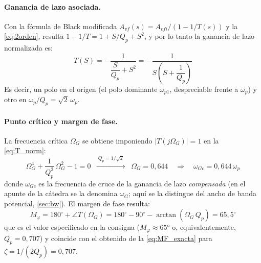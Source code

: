 \paragraph{Ganancia de lazo asociada.} Con la fórmula de Black modificada $A_{vf}(s) = A_{vfi}/(1 - 1/T(s))$ y la \autoref{eq:2orden}, resulta $1 - 1/T = 1 + S/Q_p + S^2$, y por lo tanto la ganancia de lazo normalizada es:
\begin{equation}
    T(S) = -\frac{1}{\dfrac{S}{Q_p} + S^2} = -\frac{1}{S\left(S + \dfrac{1}{Q_p}\right)}
    \label{eq:T_norm}
\end{equation}
Es decir, un polo en el origen (el polo dominante $\omega_{p1}$, despreciable frente a $\omega_p$) y otro en $\omega_p/Q_p = \sqrt{2}\,\omega_p$.

\paragraph{Punto crítico y margen de fase.} La frecuencia crítica $\Omega_G$ se obtiene imponiendo $|T(j\Omega_G)| = 1$ en la \autoref{eq:T_norm}:
\begin{equation}
    \Omega_G^4 + \frac{1}{Q_p^2}\,\Omega_G^2 - 1 = 0 \;\;\xrightarrow{\;Q_p = 1/\sqrt{2}\;}\;\; \Omega_G = 0{,}644 \quad\Rightarrow\quad \omega_{Gc} = 0{,}644\,\omega_p
    \label{eq:omegaG}
\end{equation}
donde $\omega_{Gc}$ es la frecuencia de cruce de la ganancia de lazo \emph{compensada} (en el apunte de la cátedra se la denomina $\omega_G$; aquí se la distingue del ancho de banda potencial, \autoref{sec:bw}). El margen de fase resulta:
\begin{equation}
    M_\varphi = 180^\circ + \angle T(\Omega_G) = 180^\circ - 90^\circ - \arctan\left(\Omega_G\,Q_p\right) = 65{,}5^\circ
    \label{eq:Mphi_MPM}
\end{equation}
que es el valor especificado en la consigna ($M_\varphi \approx \ang{65}$ o, equivalentemente, $Q_p = 0{,}707$) y coincide con el obtenido de la \autoref{eq:MF_exacta} para $\zeta = 1/(2Q_p) = 0{,}707$.

